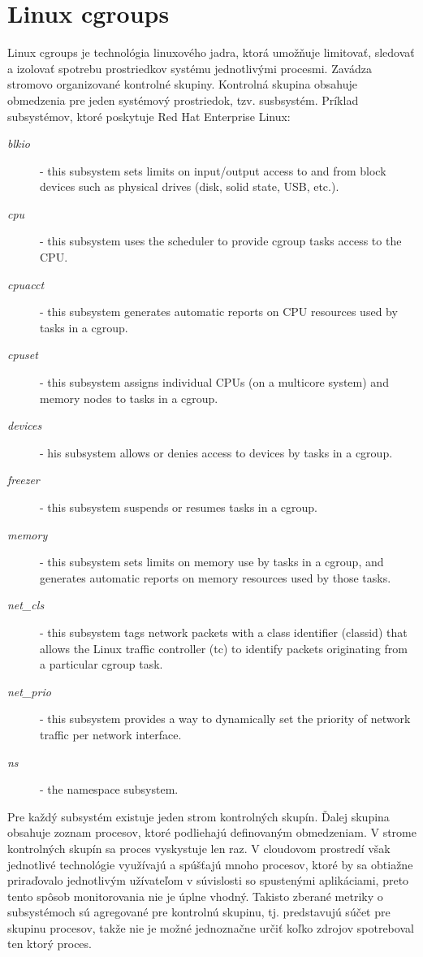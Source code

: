 \documentclass[11pt,final,oneside]{fithesis}
\begin{document}
\section{Linux cgroups}
Linux cgroups je technológia linuxového jadra, ktorá umožňuje limitovať, sledovať a izolovať spotrebu prostriedkov systému jednotlivými procesmi. Zavádza stromovo organizované kontrolné skupiny. 
Kontrolná skupina obsahuje obmedzenia pre jeden systémový prostriedok, tzv. susbsystém. Príklad subsystémov, ktoré poskytuje Red Hat Enterprise Linux: 
\begin{description}
\item[\emph{blkio}] - this subsystem sets limits on input/output access to and from block devices such as physical drives (disk, solid state, USB, etc.).
\item[\emph{cpu}] - this subsystem uses the scheduler to provide cgroup tasks access to the CPU.
\item[\emph{cpuacct}] - this subsystem generates automatic reports on CPU resources used by tasks in a cgroup.
\item[\emph{cpuset}] - this subsystem assigns individual CPUs (on a multicore system) and memory nodes to tasks in a cgroup.
\item[\emph{devices}] - his subsystem allows or denies access to devices by tasks in a cgroup.
\item[\emph{freezer}] - this subsystem suspends or resumes tasks in a cgroup.
\item[\emph{memory}] - this subsystem sets limits on memory use by tasks in a cgroup, and generates automatic reports on memory resources used by those tasks.
\item[\emph{net\_cls}] - this subsystem tags network packets with a class identifier (classid) that allows the Linux traffic controller (tc) to identify packets originating from a particular cgroup task.
\item[\emph{net\_prio}] - this subsystem provides a way to dynamically set the priority of network traffic per network interface.
\item[\emph{ns}] - the namespace subsystem.
\end{description}

Pre každý subsystém existuje jeden strom kontrolných skupín. Ďalej skupina obsahuje zoznam procesov, ktoré podliehajú definovaným obmedzeniam. V strome kontrolných skupín sa proces vyskystuje len raz.
V cloudovom prostredí však jednotlivé technológie využívajú a spúšťajú mnoho procesov, ktoré by sa obtiažne priraďovalo jednotlivým užívateľom v súvislosti so spustenými aplikáciami, preto tento spôsob
monitorovania nie je úplne vhodný. Takisto zberané metriky o subsystémoch sú agregované pre kontrolnú skupinu, tj. predstavujú súčet pre skupinu procesov, takže nie je možné jednoznačne určiť koľko zdrojov spotreboval
ten ktorý proces.
\end{document}

